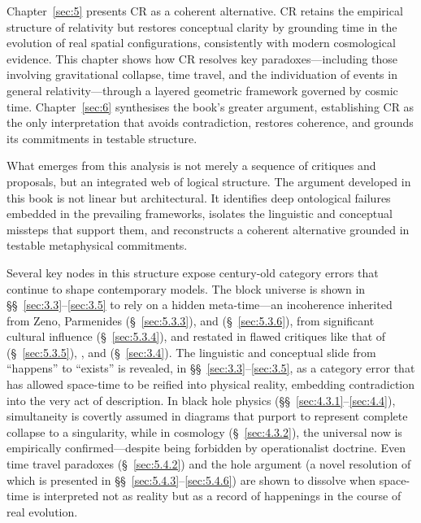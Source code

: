 \documentclass[12pt]{book}
\begin{document}
Chapter~\ref{sec:5} presents CR as a coherent alternative. CR retains the empirical structure of relativity but restores conceptual clarity by grounding time in the evolution of real spatial configurations, consistently with modern cosmological evidence. This chapter shows how CR resolves key paradoxes---including those involving gravitational collapse, time travel, and the individuation of events in general relativity---through a layered geometric framework governed by cosmic time. Chapter~\ref{sec:6} synthesises the book's greater argument, establishing CR as the only interpretation that avoids contradiction, restores coherence, and grounds its commitments in testable structure.

What emerges from this analysis is not merely a sequence of critiques and proposals, but an integrated web of logical structure. The argument developed in this book is not linear but architectural. It identifies deep ontological failures embedded in the prevailing frameworks, isolates the linguistic and conceptual missteps that support them, and reconstructs a coherent alternative grounded in testable metaphysical commitments.

Several key nodes in this structure expose century-old category errors that continue to shape contemporary models. The block universe is shown in \S\S~\ref{sec:3.3}--\ref{sec:3.5} to rely on a hidden meta-time---an incoherence inherited from Zeno, Parmenides (\S~\ref{sec:5.3.3}), and \citet{McTaggart1908} (\S~\ref{sec:5.3.6}), from significant cultural influence \citep{Wells1895} (\S~\ref{sec:5.3.4}), and restated in flawed critiques like that of \citet{Price2011} (\S~\ref{sec:5.3.5}), \cite{Einstein1938}, and \cite{Greene2004} (\S~\ref{sec:3.4}). The linguistic and conceptual slide from ``happens'' to ``exists'' is revealed, in \S\S~\ref{sec:3.3}--\ref{sec:3.5}, as a category error that has allowed space-time to be reified into physical reality, embedding contradiction into the very act of description. In black hole physics (\S\S~\ref{sec:4.3.1}--\ref{sec:4.4}), simultaneity is covertly assumed in diagrams that purport to represent complete collapse to a singularity, while in cosmology (\S~\ref{sec:4.3.2}), the universal now is empirically confirmed---despite being forbidden by operationalist doctrine. Even time travel paradoxes (\S~\ref{sec:5.4.2}) and the hole argument (a novel resolution of which is presented in \S\S~\ref{sec:5.4.3}--\ref{sec:5.4.6}) are shown to dissolve when space-time is interpreted not as reality but as a record of happenings in the course of real evolution.
\end{document}
